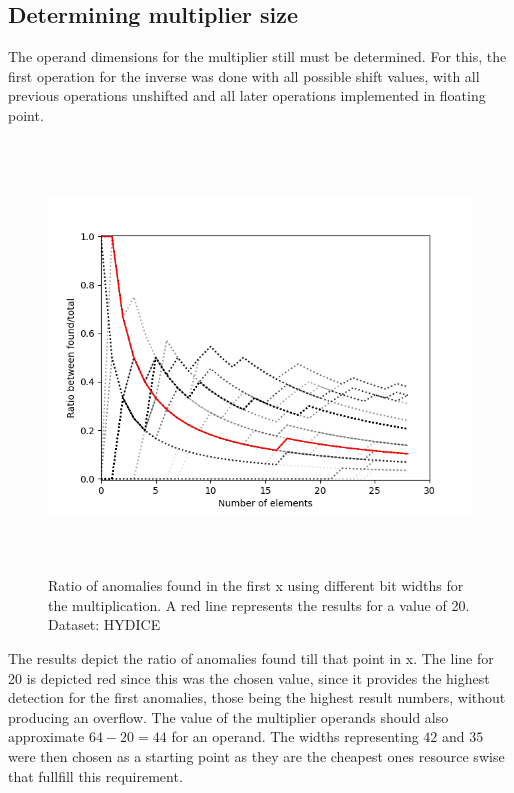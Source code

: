 \pagebreak
\subsection{Determining multiplier size}
The operand dimensions for the multiplier still must be determined. For this, the first operation for the inverse was done with all possible shift values, with all previous operations unshifted and all later operations implemented in floating point.

\begin{figure}[h!]
\centering
\includegraphics[height=4.5in]{figures/res_f.png}
\caption[Precision of calculations with different shift values]{Ratio of anomalies found in the first x using different bit widths for the multiplication. A red line represents the results for a value of 20. Dataset: HYDICE}
  \label{fig:res_f}
\end{figure}

The results depict the ratio of anomalies found till that point in x. The line for 20 is depicted red since this was the chosen value, since it provides the highest detection for the first anomalies, those being the highest result numbers, without producing an overflow. The value of the multiplier operands should also approximate $64-20 = 44$ for an operand. The widths representing $42$ and $35$ were then chosen as a starting point as they are the cheapest ones resource swise that fullfill this requirement.
\\

